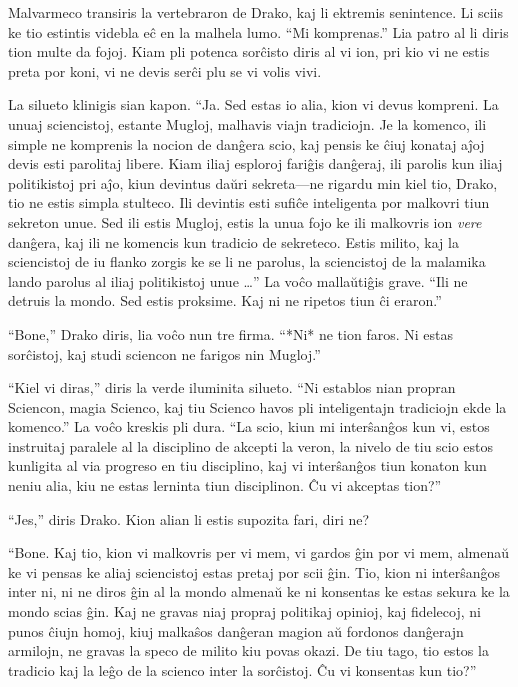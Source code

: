 Malvarmeco transiris la vertebraron de Drako, kaj li ektremis
senintence. Li sciis ke tio estintis videbla eĉ en la malhela
lumo. ``Mi komprenas.'' Lia patro al li diris tion multe da
fojoj. Kiam pli potenca sorĉisto diris al vi ion, pri kio vi ne estis
preta por koni, vi ne devis serĉi plu se vi volis vivi.

La silueto klinigis sian kapon. ``Ja. Sed estas io alia, kion vi devus
kompreni. La unuaj sciencistoj, estante Mugloj, malhavis viajn
tradiciojn. Je la komenco, ili simple ne komprenis la nocion de
danĝera scio, kaj pensis ke ĉiuj konataj aĵoj devis esti parolitaj
libere. Kiam iliaj esploroj fariĝis danĝeraj, ili parolis kun iliaj
politikistoj pri aĵo, kiun devintus daŭri sekreta—ne rigardu min kiel
tio, Drako, tio ne estis simpla stulteco. Ili devintis esti sufiĉe
inteligenta por malkovri tiun sekreton unue. Sed ili estis Mugloj,
estis la unua fojo ke ili malkovris ion \emph{vere} danĝera, kaj ili
ne komencis kun tradicio de sekreteco. Estis milito, kaj la
sciencistoj de iu flanko zorgis ke se li ne parolus, la sciencistoj de
la malamika lando parolus al iliaj politikistoj unue \ldots'' La voĉo
mallaŭtiĝis grave. ``Ili ne detruis la mondo. Sed estis proksime. Kaj
ni ne ripetos tiun ĉi eraron.''

``Bone,'' Drako diris, lia voĉo nun tre firma. ``*Ni* ne tion
faros. Ni estas sorĉistoj, kaj studi sciencon ne farigos nin Mugloj.''

``Kiel vi diras,'' diris la verde iluminita silueto. ``Ni establos
nian propran Sciencon, magia Scienco, kaj tiu Scienco havos pli
inteligentajn tradiciojn ekde la komenco.'' La voĉo kreskis pli
dura. ``La scio, kiun mi interŝanĝos kun vi, estos instruitaj paralele
al la disciplino de akcepti la veron, la nivelo de tiu scio estos
kunligita al via progreso en tiu disciplino, kaj vi interŝanĝos tiun
konaton kun neniu alia, kiu ne estas lerninta tiun disciplinon. Ĉu vi
akceptas tion?''

``Jes,'' diris Drako. Kion alian li estis supozita fari, diri ne?

``Bone. Kaj tio, kion vi malkovris per vi mem, vi gardos ĝin por vi
mem, almenaŭ ke vi pensas ke aliaj sciencistoj estas pretaj por scii
ĝin. Tio, kion ni interŝanĝos inter ni, ni ne diros ĝin al la mondo
almenaŭ ke ni konsentas ke estas sekura ke la mondo scias ĝin. Kaj ne
gravas niaj propraj politikaj opinioj, kaj fidelecoj, ni punos ĉiujn
homoj, kiuj malkaŝos danĝeran magion aŭ fordonos danĝerajn armilojn,
ne gravas la speco de milito kiu povas okazi. De tiu tago, tio estos
la tradicio kaj la leĝo de la scienco inter la sorĉistoj. Ĉu vi
konsentas kun tio?''

